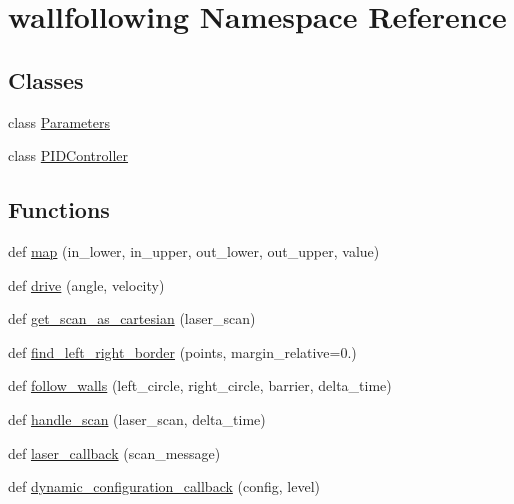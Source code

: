 \hypertarget{namespacewallfollowing}{}\section{wallfollowing Namespace Reference}
\label{namespacewallfollowing}
\subsection*{Classes}
\begin{DoxyCompactItemize}
\item 
class \hyperlink{classwallfollowing_1_1_parameters}{Parameters}
\item 
class \hyperlink{classwallfollowing_1_1_p_i_d_controller}{P\+I\+D\+Controller}
\end{DoxyCompactItemize}
\subsection*{Functions}
\begin{DoxyCompactItemize}
\item 
def \hyperlink{namespacewallfollowing_a908b60b64e20dec7078e707a829b610d}{map} (in\+\_\+lower, in\+\_\+upper, out\+\_\+lower, out\+\_\+upper, value)
\item 
def \hyperlink{namespacewallfollowing_a66b98adda1f5c1ba1ed6c0029a5d27f6}{drive} (angle, velocity)
\item 
def \hyperlink{namespacewallfollowing_aacb7060aae10ef40bdacceb57283943c}{get\+\_\+scan\+\_\+as\+\_\+cartesian} (laser\+\_\+scan)
\item 
def \hyperlink{namespacewallfollowing_a85455c82dd12c297c8cbc3227c1ba598}{find\+\_\+left\+\_\+right\+\_\+border} (points, margin\+\_\+relative=0.)
\item 
def \hyperlink{namespacewallfollowing_ae4edc6135d6c1a9b38674119a96b3375}{follow\+\_\+walls} (left\+\_\+circle, right\+\_\+circle, barrier, delta\+\_\+time)
\item 
def \hyperlink{namespacewallfollowing_a48cc636bf9056c7b7b2db2dede94474a}{handle\+\_\+scan} (laser\+\_\+scan, delta\+\_\+time)
\item 
def \hyperlink{namespacewallfollowing_a53e20aefe2b925b41b17f60b6673840b}{laser\+\_\+callback} (scan\+\_\+message)
\item 
def \hyperlink{namespacewallfollowing_aa82241200b0cac397334403b54a2c1ad}{dynamic\+\_\+configuration\+\_\+callback} (config, level)
\end{DoxyCompactItemize}
